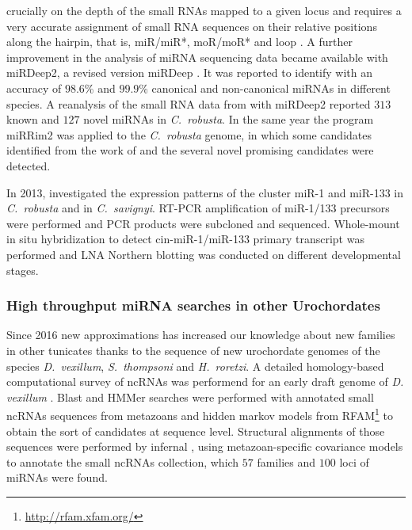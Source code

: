 \documentclass[graybox]{svmult}
\begin{document}
crucially on the depth of the small RNAs mapped to a given locus and
requires a very accurate assignment of small RNA sequences on their
relative positions along the hairpin, that is, miR/miR*, moR/moR* and loop
\citep{Hendrix2010}. A further improvement in the analysis of miRNA
sequencing data became available with miRDeep2, a revised version miRDeep
\citep{Friedlaender:12}.  It was reported to identify with an accuracy of
$98.6$\% and $99.9$\% canonical and non-canonical miRNAs in different
species. A reanalysis of the small RNA data from \citep{Shi2009} with
miRDeep2 reported $313$ known and $127$ novel miRNAs in \textit{C.\
  robusta}. In the same year the program miRRim2 \citep{Terai2012} was
applied to the \textit{C.\ robusta} genome, in which some candidates
identified from the work of \citet{Hendrix2010} and the several novel promising
candidates were detected.

In 2013, \citep{Kusakabe2013} investigated the expression patterns of the
cluster miR-1 and miR-133 in \textit{C.\ robusta} and in \textit{C.\
  savignyi}. RT-PCR amplification of miR-1/133 precursors were performed
and PCR products were subcloned and sequenced. Whole-mount in situ
hybridization to detect cin-miR-1/miR-133 primary transcript was performed
and LNA Northern blotting was conducted on different developmental stages.

\subsubsection{High throughput miRNA searches in other Urochordates}

Since 2016 new approximations has increased our knowledge about new
families in other tunicates thanks to the sequence of new urochordate
genomes of the species \textit{D.\ vexillum}, \textit{S.\ thompsoni} and
\textit{H.\ roretzi}. A detailed homology-based computational survey of ncRNAs
was performend for an early draft genome of \textit{D. vexillum}
\citep{Velandia-Huerto2016}.  Blast and HMMer searches were performed with
annotated small ncRNAs sequences from metazoans and hidden markov models
from RFAM\footnote{\url{http://rfam.xfam.org/}} to obtain the sort of
candidates at sequence level. Structural alignments of those sequences were
performed by infernal \citep{Nawrocki:2013}, using metazoan-specific
covariance models to annotate the small ncRNAs collection, which $57$
families and $100$ loci of miRNAs were found.
\end{document}
